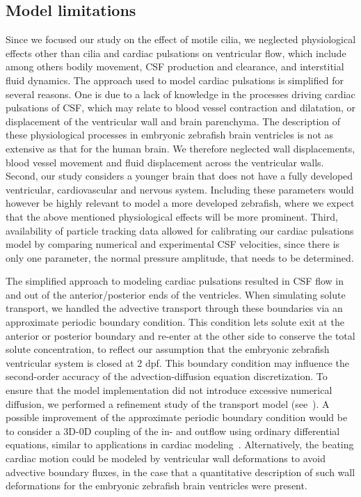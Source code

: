 \documentclass{WileyMSP-template}
\begin{document}
\subsection{Model limitations}
Since we focused our study on the effect of motile cilia, we neglected
physiological effects other than cilia and cardiac pulsations on ventricular flow,
which include among others bodily movement, CSF production and clearance,
and interstitial fluid dynamics.
The approach used to model cardiac pulsations is simplified for several reasons.
One is due to a lack of knowledge in the processes driving cardiac pulsations of CSF,
which may relate to blood vessel contraction and dilatation,
or displacement of the ventricular wall and brain parenchyma.
The description of these physiological processes in
embryonic zebrafish brain ventricles
is not as extensive as that for the human brain. We therefore
neglected wall displacements, blood vessel movement and fluid
displacement across the ventricular walls.
Second, our study considers a younger brain that does not have a fully developed ventricular,
cardiovascular and nervous system.
Including these parameters would however be highly relevant to model a more developed zebrafish,
where we expect that the above mentioned physiological effects will be more prominent. 
Third, availability of particle tracking data allowed for calibrating 
our cardiac pulsations model by comparing numerical and experimental CSF
velocities, since there is only one parameter, the normal
pressure amplitude, that needs to be determined.

The simplified approach to modeling cardiac pulsations
resulted in CSF flow in and out of the 
anterior/posterior ends of the ventricles.
When simulating solute transport, we handled the advective transport
through these boundaries
via an approximate periodic boundary condition.
This condition lets solute exit at the anterior or posterior
boundary and re-enter at the other side to
conserve the total solute concentration,
to reflect our assumption that the embryonic zebrafish
ventricular system is closed at 2 dpf. This boundary
condition may influence the second-order accuracy of
the advection-diffusion equation discretization. 
To ensure that the model implementation did not
introduce excessive numerical diffusion, we
performed a refinement study of the transport model (see~).
A possible improvement of the approximate periodic boundary
condition would be
to consider a 3D-0D coupling of the in- and outflow using
ordinary differential equations,
similar to applications in cardiac
modeling~\cite{Brown2024AMechanics, Augustin2021ACirculation}.
Alternatively, the beating cardiac motion could be
modeled by ventricular wall deformations
to avoid advective boundary fluxes\cite{Causemann2022HumanFramework,
Kurtcuoglu2005ComputationalSystem, Kurtcuoglu2007ComputationalSylvius, Linninger2005PulsatileBrain},
in the case that a quantitative description of such wall deformations for the embryonic
zebrafish brain ventricles were present.
\end{document}
